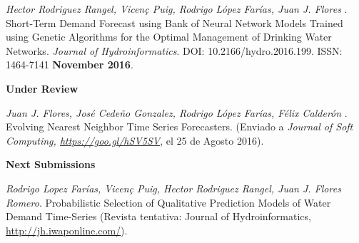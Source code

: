 \documentclass[10pt]{article}
\newenvironment{innerlist}[1][\enskip\textbullet]%
        {\begin{compactitem}[#1]}{\end{compactitem}}
\begin{document}
\begin{innerlist}
\item \textit{Hector Rodriguez Rangel, Vicen\c{c} Puig, Rodrigo López Farías, Juan J. Flores }.  Short-Term Demand Forecast using Bank of Neural Network Models Trained using Genetic Algorithms for the Optimal Management of Drinking Water Networks.  \textit{Journal of Hydroinformatics}. DOI: 10.2166/hydro.2016.199. ISSN: 1464-7141 \textbf{November 2016}.
\end{innerlist}


\textbf{Under Review}
\begin{innerlist}
\item \textit{Juan J. Flores, José Cede\~no Gonzalez, Rodrigo López Farías, Félix Calderón }.  Evolving Nearest Neighbor Time Series Forecasters. (Enviado a \textit{Journal of Soft Computing, \url{https://goo.gl/hSV5SV}}, el 25 de Agosto 2016).
\end{innerlist}



\textbf{Next Submissions}
\begin{innerlist}
\item \textit{Rodrigo Lopez Farías, Vicen\c{c} Puig, Hector Rodriguez Rangel, Juan J. Flores Romero}.  Probabilistic Selection of Qualitative Prediction Models of Water Demand Time-Series (Revista tentativa: Journal of Hydroinformatics, \url{http://jh.iwaponline.com/}).
\end{innerlist}
\end{document}
